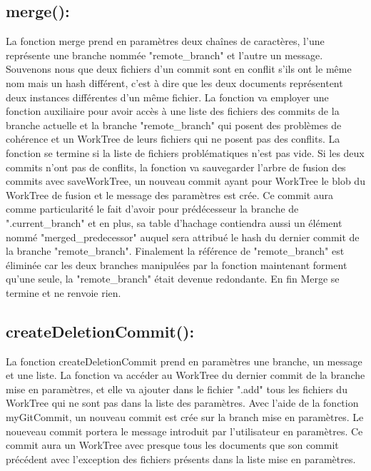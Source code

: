 \documentclass[11pt,francais]{article}
\begin{document}
\subsection{merge():}
	La fonction merge prend en paramètres  deux chaînes de caractères, l'une représente une branche nommée "remote\_branch" et l'autre un message. Souvenons nous que deux fichiers d'un commit sont en conflit s'ils ont le même nom mais un hash différent, c'est à dire que les deux documents représentent deux instances différentes d'un même fichier. La fonction va employer une fonction auxiliaire pour avoir accès à une liste des fichiers des commits de la branche actuelle et la branche "remote\_branch" qui posent des problèmes de cohérence et un WorkTree de leurs fichiers qui ne posent pas des conflits. La fonction se termine si la liste de fichiers problématiques n'est pas vide. 
	Si les deux commits n'ont pas de conflits, la fonction va sauvegarder l'arbre de fusion des commits avec saveWorkTree, un nouveau commit ayant pour WorkTree le blob du WorkTree de fusion et le message des paramètres est crée. Ce commit aura comme particularité le fait d'avoir pour prédécesseur la branche de ".current\_branch" et en plus, sa table d'hachage contiendra aussi un élément nommé "merged\_predecessor" auquel sera attribué le hash du dernier commit de la branche "remote\_branch". Finalement la référence de "remote\_branch" est éliminée car les deux branches manipulées par la fonction maintenant forment qu'une seule, la "remote\_branch" était devenue redondante.  En fin Merge se termine et ne renvoie rien. 
	
\subsection{createDeletionCommit():}
	La fonction createDeletionCommit prend en paramètres une branche, un message et une liste. La fonction va accéder au WorkTree du dernier commit de la branche mise en paramètres, et elle va ajouter dans le fichier ".add" tous les fichiers du WorkTree qui ne sont pas dans la liste des paramètres.  Avec l'aide de la fonction myGitCommit, un nouveau commit est crée sur la branch mise en paramètres. Le noueveau commit portera le message introduit par l'utilisateur en paramètres. Ce commit aura un WorkTree avec presque tous les documents que son commit précédent avec l'exception des fichiers présents dans la liste mise en paramètres. 
	
\end{document}
